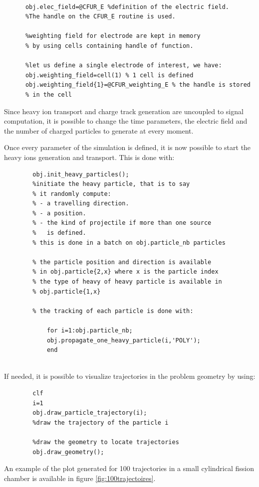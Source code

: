 \documentclass[10pt]{article}
\begin{document}
	  \begin{lstlisting}
	  
	  obj.elec_field=@CFUR_E %definition of the electric field.
	  %The handle on the CFUR_E routine is used.
	  
	  %weighting field for electrode are kept in memory
	  % by using cells containing handle of function.
	  
	  %let us define a single electrode of interest, we have:
	  obj.weighting_field=cell(1) % 1 cell is defined
	  obj.weighting_field{1}=@CFUR_weighting_E % the handle is stored 
	  % in the cell
	  \end{lstlisting}
	  
	  Since heavy ion transport and charge track generation are uncoupled to signal computation, it is possible to change the time parameters, the electric field and the number of charged particles to generate at every moment.
	
		Once every parameter of the simulation is defined, it is now possible to start the heavy ions generation and transport. This is done with:
		
		\begin{lstlisting}
		obj.init_heavy_particles(); 
		%initiate the heavy particle, that is to say
		% it randomly compute:
		% - a travelling direction.
		% - a position.
		% - the kind of projectile if more than one source
		%   is defined. 
		% this is done in a batch on obj.particle_nb particles
		
		% the particle position and direction is available
		% in obj.particle{2,x} where x is the particle index
		% the type of heavy of heavy particle is available in
		% obj.particle{1,x}
		
		% the tracking of each particle is done with:
			
			for i=1:obj.particle_nb;
			obj.propagate_one_heavy_particle(i,'POLY');
			end
		
		\end{lstlisting}
		
		If needed, it is possible to visualize trajectories in the problem geometry by using:
		
		\begin{lstlisting}
		clf 
		i=1
		obj.draw_particle_trajectory(i);
		%draw the trajectory of the particle i
		
		%draw the geometry to locate trajectories
		obj.draw_geometry();
		\end{lstlisting}
		An example of the plot generated for 100 trajectories in a small cylindrical fission chamber is available in figure \ref{fig:100trajectoires}.
		
\end{document}
